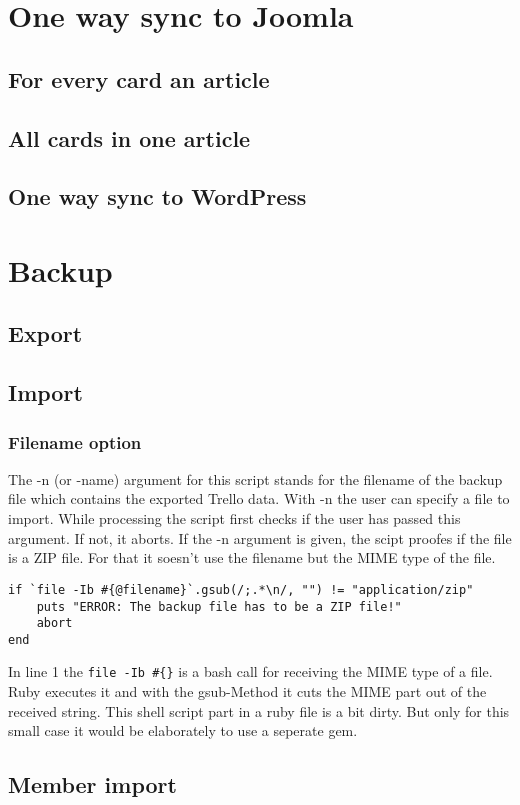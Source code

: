 \section{One way sync to Joomla}

\subsection{For every card an article}

\subsection{All cards in one article}

\subsection{One way sync to WordPress}

\section{Backup}

\subsection{Export}

\subsection{Import}

\subsubsection{Filename option}
The -n (or -name) argument for this script stands for the filename of the backup file which contains the  exported Trello data. With -n the user can specify a file to import. While processing the script first checks if the user has passed this argument. If not, it aborts. If the -n argument is given, the scipt proofes if the file is a ZIP file. For that it soesn't use the filename but the MIME type of the file.

\begin{lstlisting}[float=htb, caption=Checking if the file has the MIME type \textquotedblleft application/zip\textquotedblright, label=listing008]
if `file -Ib #{@filename}`.gsub(/;.*\n/, "") != "application/zip"
	puts "ERROR: The backup file has to be a ZIP file!"
	abort
end
\end{lstlisting}

	
In line 1 the \texttt{file -Ib \#\{\@filename\}} is a bash call for receiving the MIME type of a file. Ruby executes it and with the gsub-Method it cuts the MIME part out of the received string. This shell script part in a ruby file is a bit dirty. But only for this small case it would be elaborately to use a seperate gem.


\subsection{Member import}

